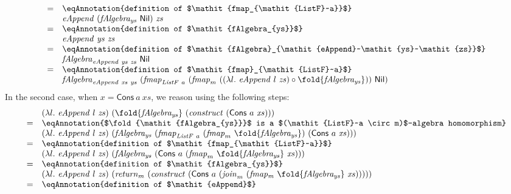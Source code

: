 \begin{proof*}
\begin{displaymath}
\begin{array}{cl}
      =&\eqAnnotation{definition of $\mathit{fmap_{\mathit{ListF}~a}}$} \\
      &\mathit{eAppend}~(\mathit{fAlgebra_{ys}}~\mathsf{Nil})~\mathit{zs} \\
      =&\eqAnnotation{definition of $\mathit{fAlgebra_{ys}}$} \\
      &\mathit{eAppend}~\mathit{ys}~\mathit{zs} \\
      =&\eqAnnotation{definition of $\mathit{fAlgebra}_{\mathit{eAppend}~\mathit{ys}~\mathit{zs}}$} \\
      &\mathit{fAlgebra}_{\mathit{eAppend}~\mathit{ys}~\mathit{zs}}~\mathsf{Nil} \\
      =&\eqAnnotation{definition of $\mathit{fmap}_{\mathit{ListF}~a}$} \\
      &\mathit{fAlgebra}_{\mathit{eAppend}~\mathit{xs}~\mathit{ys}}~(\mathit{fmap}_{\mathit{ListF}~a}~(\mathit{fmap}_m~((\lambda l.~\mathit{eAppend}~l~\mathit{zs}) \circ \fold{\mathit{fAlgebra_{ys}}}))~\mathsf{Nil})
    \end{array}
  \end{displaymath}
  In the second case, when $x = \mathsf{Cons}~a~\mathit{xs}$, we
  reason using the following steps:
  \begin{displaymath}
    \begin{array}{cl}
      &(\lambda l.~\mathit{eAppend}~l~\mathit{zs})~(\fold{\mathit{fAlgebra_{ys}}}~(\mathit{construct}~(\mathsf{Cons}~a~\mathit{xs}))) \\
      =&\eqAnnotation{$\fold{\mathit{fAlgebra_{ys}}}$ is a $(\mathit{ListF}~a \circ m)$-algebra homomorphism} \\
      &(\lambda l.~\mathit{eAppend}~l~\mathit{zs})~(\mathit{fAlgebra_{ys}}~(\mathit{fmap}_{\mathit{ListF}~a}~(\mathit{fmap}_m~\fold{\mathit{fAlgebra_{ys}}})~(\mathsf{Cons}~a~\mathit{xs}))) \\
      =&\eqAnnotation{definition of $\mathit{fmap_{\mathit{ListF}~a}}$} \\
      &(\lambda l.~\mathit{eAppend}~l~\mathit{zs})~(\mathit{fAlgebra_{ys}}~(\mathsf{Cons}~a~(\mathit{fmap}_m~\fold{\mathit{fAlgebra_{ys}}}~\mathit{xs}))) \\
      =&\eqAnnotation{definition of $\mathit{fAlgebra_{ys}}$} \\
      & (\lambda l.~\mathit{eAppend}~l~\mathit{zs})~(\mathit{return}_m~(\mathit{construct}~(\mathsf{Cons}~a~(\mathit{join}_m~(\mathit{fmap_m}~\fold{\mathit{fAlgebra_{ys}}}~\mathit{xs}))))) \\
      =&\eqAnnotation{definition of $\mathit{eAppend}$} \\

\end{array}
\end{displaymath}
\end{proof*}
